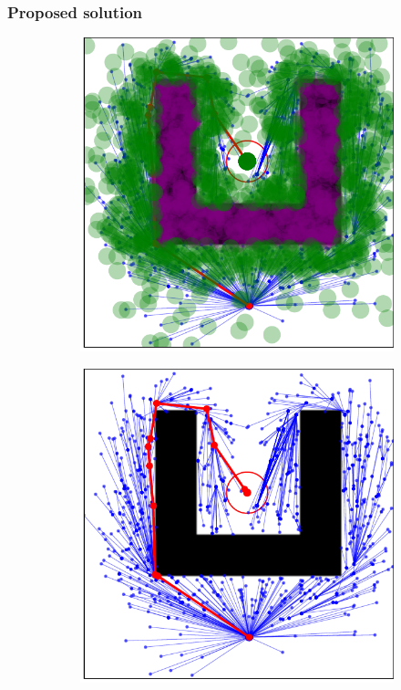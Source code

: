 \documentclass{beamer}
\begin{document}

\begin{frame}
	\frametitle{Proposed solution}	
	\begin{figure}[!ht]
		\centering 
		\begin{subfigure}[b]{0.45\textwidth}
			\includegraphics[width=\textwidth]{figChap4/RRTstarML_learning206.0.pdf}
			 
		\end{subfigure}  
		\begin{subfigure}[b]{0.45\textwidth}
			\includegraphics[width=\textwidth]{figChap4/RRTstarML_maze206.0.pdf}
			 

\end{subfigure}
\end{figure}
\end{frame}
\end{document}
